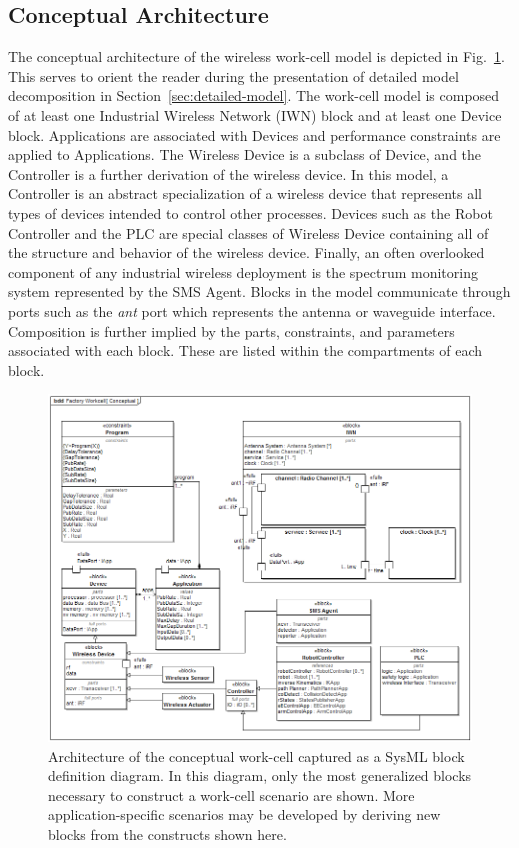 \documentclass[journal, twoside]{IEEEtran}
\begin{document}
	\subsection{Conceptual Architecture}\label{sec:architecture}
	The conceptual architecture of the wireless work-cell model is depicted in Fig.~\ref{fig:conceptual:bdd}.  This serves to orient the reader during the presentation of detailed model decomposition in Section~\ref{sec:detailed-model}.  The work-cell model is composed of at least one Industrial Wireless Network (IWN) block and at least one Device block.  Applications are associated with Devices and performance constraints are applied to Applications. The Wireless Device is a subclass of Device, and the Controller is a further derivation of the wireless device. In this model, a Controller is an abstract specialization of a wireless device that represents all types of devices intended to control other processes.  Devices such as the Robot Controller and the PLC are special classes of Wireless Device containing all of the structure and behavior of the wireless device.  Finally, an often overlooked component of any industrial wireless deployment is the spectrum monitoring system represented by the SMS Agent. Blocks in the model communicate through ports such as the \textit{ant} port which represents the antenna or waveguide interface.  Composition is further implied by the parts, constraints, and parameters associated with each block. These are listed within the compartments of each block.
    
	\begin{figure}
		\centering
		\includegraphics[width=\textwidth]{diagrams/bdd__Factory_Workcell__Conceptual}%
		\caption{Architecture of the conceptual work-cell captured as a SysML block definition diagram.  In this diagram, only the most generalized blocks necessary to construct a work-cell scenario are shown.  More application-specific scenarios may be developed by deriving new blocks from the constructs shown here. }%
		\label{fig:conceptual:bdd}
	\end{figure}
	
\end{document}
